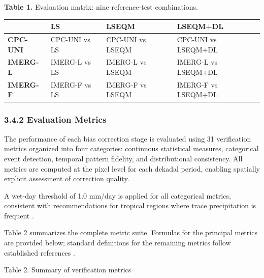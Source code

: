 \documentclass[
]{article}
\begin{document}
\textbf{Table 1.} Evaluation matrix: nine reference-test combinations.

\begin{longtable}[]{@{}llll@{}}
\toprule\noalign{}
& \textbf{LS} & \textbf{LSEQM} & \textbf{LSEQM+DL} \\
\midrule\noalign{}
\endhead
\bottomrule\noalign{}
\endlastfoot
\textbf{CPC-UNI} & CPC-UNI vs LS & CPC-UNI vs LSEQM & CPC-UNI vs
LSEQM+DL \\
\textbf{IMERG-L} & IMERG-L vs LS & IMERG-L vs LSEQM & IMERG-L vs
LSEQM+DL \\
\textbf{IMERG-F} & IMERG-F vs LS & IMERG-F vs LSEQM & IMERG-F vs
LSEQM+DL \\
\end{longtable}

\subsubsection{3.4.2 Evaluation Metrics}\label{evaluation-metrics}

The performance of each bias correction stage is evaluated using 31
verification metrics organized into four categories: continuous
statistical measures, categorical event detection, temporal pattern
fidelity, and distributional consistency. All metrics are computed at
the pixel level for each dekadal period, enabling spatially explicit
assessment of correction quality.

A wet-day threshold of 1.0 mm/day is applied for all categorical
metrics, consistent with recommendations for tropical regions where
trace precipitation is frequent \cite{ref24}.

Table 2 summarizes the complete metric suite. Formulas for the principal
metrics are provided below; standard definitions for the remaining
metrics follow established references \cite{ref14,ref15}.

Table 2. Summary of verification metrics
\end{document}
